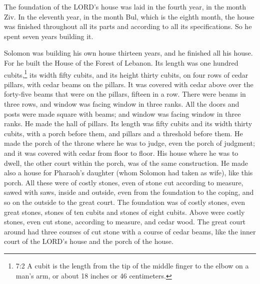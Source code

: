 \myverse{}The foundation of the LORD’s house was laid in the fourth year,
in the month Ziv.
\myverse{}In the eleventh year, in the month Bul, which is the eighth month, the house
was finished throughout all its parts and according to all its specifications. So he spent seven years
building it.


\mychapter{} \myverse*{}Solomon was building his own house thirteen years, and he finished
all his house.
\myverse{}For he built the House of the Forest of Lebanon. Its length was one hundred
cubits,\footnote{7:2 A cubit is the length from the tip of the middle finger to the elbow on a man’s arm, or about
	18 inches or 46 centimeters.} its width fifty cubits, and its height thirty cubits, on four rows
of cedar pillars, with cedar beams on the pillars.
\myverse{}It was covered with cedar above over the forty-five beams that were on the pillars,
fifteen in a row.
\myverse{}There were beams in three rows, and window was facing window in three ranks.
\myverse{}All the doors and posts were made square with beams; and window was facing window
in three ranks.
\myverse{}He made the hall of pillars. Its length was fifty cubits and its width thirty
cubits, with a porch before them, and pillars and a threshold before them.
\myverse{}He made the porch of the throne where he was to judge, even the porch of judgment;
and it was covered with cedar from floor to floor.
\myverse{}His house where he was to dwell, the other court within the porch, was of the
same construction. He made also a house for Pharaoh’s daughter (whom Solomon had taken as wife), like
this porch.
\myverse{}All these were of costly stones, even of stone cut according to measure, sawed
with saws, inside and outside, even from the foundation to the coping, and so on the outside to the great
court.
\myverse{}The foundation was of costly stones, even great stones, stones of ten cubits
and stones of eight cubits.
\myverse{}Above were costly stones, even cut stone, according to measure, and cedar
wood.
\myverse{}The great court around had three courses of cut stone with a course of cedar
beams, like the inner court of the LORD’s house and the porch of the house.

